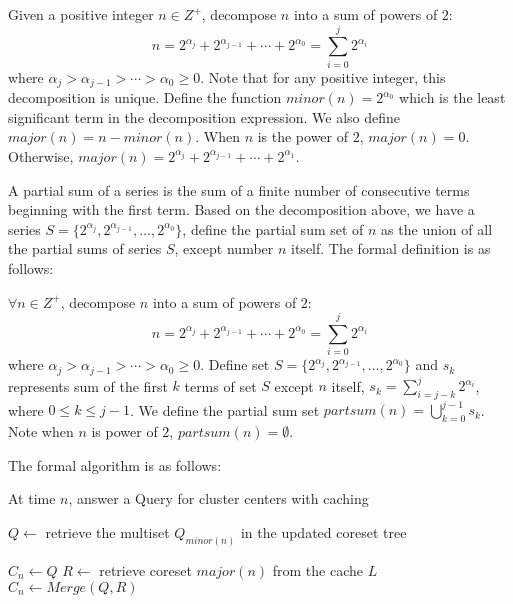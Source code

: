 {{\begin{definition}
\label{defn: major&minor}
Given a positive integer $n\in Z^+$, decompose $n$ into a sum of powers of $2$: 
\[
n = 2^{\alpha_j}+2^{\alpha_{j-1}}+ \cdots + 2^{\alpha_0} = \sum_{i=0}^j2^{\alpha_i}
\]
where $\alpha_j>\alpha_{j-1}>\cdots>\alpha_0\geq 0$. Note that for any positive integer, this decomposition is unique.
Define the function $minor(n) = 2^{\alpha_0}$ which is the least significant term in the decomposition expression.
We also define $major(n) = n - minor(n)$. When $n$ is the power of $2$, $major(n) = 0$. Otherwise, $major(n) = 2^{\alpha_j}+2^{\alpha_{j-1}}+ \cdots + 2^{\alpha_1}$.
\end{definition}

A partial sum of a series is the sum of a finite number of consecutive terms beginning with the first term. Based on the decomposition above, we have a series $S = \{2^{\alpha_j}, 2^{\alpha_{j-1}}, \ldots, 2^{\alpha_0}\}$, define the partial sum set of $n$ as the union of all the partial sums of series $S$, except number $n$ itself. The formal definition is as follows:

\begin{definition}
\label{defn: partial sum set}
$\forall n\in Z^+$, decompose $n$ into a sum of powers of $2$:
\[
n = 2^{\alpha_j}+2^{\alpha_{j-1}}+ \cdots + 2^{\alpha_0} = \sum_{i=0}^j2^{\alpha_i}
\]
where $\alpha_j>\alpha_{j-1}>\cdots>\alpha_0\geq 0$. 
Define set $S = \{2^{\alpha_j}, 2^{\alpha_{j-1}}, \ldots, 2^{\alpha_0}\}$ and $s_k$ represents sum of the first $k$ terms of set $S$ except $n$ itself, $s_k = \sum_{i=j-k}^j2^{\alpha_i}$, where $0 \leq k \leq j-1$. We define the partial sum set $partsum(n) = \bigcup_{k=0}^{j-1}s_k$. Note when $n$ is power of $2$, $partsum(n) = \emptyset$.
\end{definition}

The formal algorithm is as follows:
\newline

\begin{algorithm}
\caption{\sf At time $n$, answer a Query for cluster centers with caching}
\BlankLine

$Q \leftarrow$ retrieve the multiset $Q_{minor(n)}$ in the updated coreset tree \;

 {     
	$C_n \leftarrow Q$\;
} {
	$R \leftarrow$ retrieve coreset $major(n)$ from the cache $L$\;
	$C_n \leftarrow Merge(Q, R)$\;
}


\end{algorithm}}}
